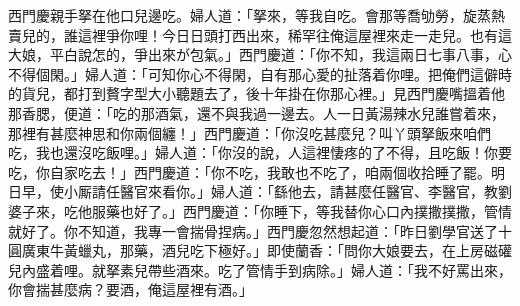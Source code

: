 西門慶親手拏在他口兒邊吃。婦人道：「拏來，等我自吃。會那等喬劬勞，旋蒸熱賣兒的，{}誰這裡爭你哩！{}{}今日日頭打西出來，稀罕往俺這屋裡來走一走兒。也有這大娘，平白說怎的，爭出來が包氣。」西門慶道：「你不知，我這兩日七事八事，心不得個閑。」{}婦人道：「可知你心不得閑，自有那心愛的扯落着你哩。把俺們這僻時的貨兒，都打到贅字型大小聽題去了，後十年掛在你那心裡。」{}見西門慶嘴搵着他那香腮，便道：「吃的那酒氣，還不與我過一邊去。人一日黃湯辣水兒誰嘗着來，那裡有甚麼神思和你兩個纏！」西門慶道：「你沒吃甚麼兒？叫丫頭拏飯來咱們吃，我也還沒吃飯哩。」婦人道：「你沒的說，人這裡悽疼的了不得，且吃飯！你要吃，你自家吃去！」西門慶道：「你不吃，我敢也不吃了，咱兩個收拾睡了罷。明日早，使小厮請任醫官來看你。」婦人道：「繇他去，請甚麼任醫官、李醫官，教劉婆子來，吃他服藥也好了。」西門慶道：「你睡下，等我替你心口內撲撒撲撒，管情就好了。你不知道，我專一會揣骨捏病。」{}西門慶忽然想起道：「昨日劉學官送了十圓廣東牛黃蠟丸，那藥，酒兒吃下極好。」即使蘭香：「問你大娘要去，在上房磁礶兒內盛着哩。就拏素兒帶些酒來。吃了管情手到病除。」婦人道：「我不好罵出來，你會揣甚麼病？要酒，俺這屋裡有酒。」

